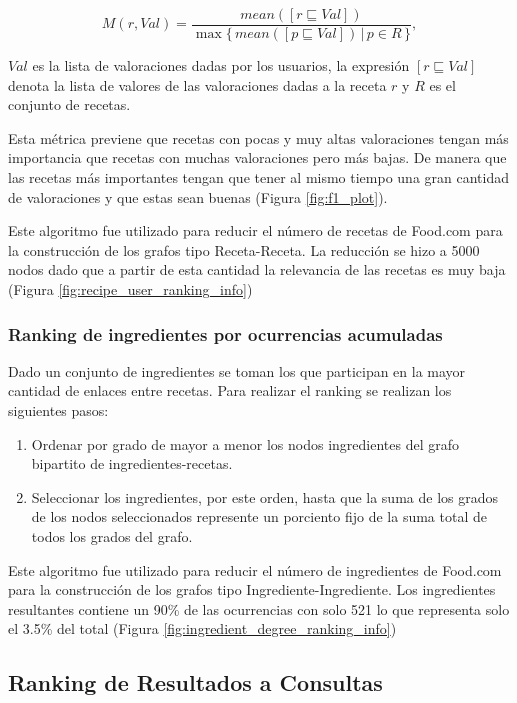 \documentclass[
	a4paper, %
	10pt, %
	unnumberedsections, %
	twoside, %
]{LTJournalArticle}
\begin{document}
\begin{equation*}
	M(r, Val) = \frac{mean([r \sqsubseteq Val])}{\max \{\,mean([p \sqsubseteq Val]) \, \vert \, p \in R\,\}},
\end{equation*}

$Val$ es la lista de valoraciones dadas por los usuarios, la expresión $[r \sqsubseteq Val]$ denota la lista de valores de 
las valoraciones dadas a la receta $r$ y $R$ es el conjunto de recetas.

Esta métrica previene que recetas con pocas y muy altas valoraciones tengan más importancia que recetas con muchas
valoraciones pero más bajas. De manera que las recetas más importantes tengan que tener al mismo tiempo una gran 
cantidad de valoraciones y que estas sean buenas (Figura \ref{fig:f1_plot}).

Este algoritmo fue utilizado para reducir el número de recetas de Food.com para la construcción de los grafos 
tipo Receta-Receta. La reducción se hizo a 5000 nodos dado que a partir de esta cantidad la relevancia de las
recetas es muy baja (Figura \ref{fig:recipe_user_ranking_info})

\subsubsection{Ranking de ingredientes por ocurrencias acumuladas}

Dado un conjunto de ingredientes se toman los que participan en la mayor cantidad de enlaces entre recetas.
Para realizar el ranking se realizan los siguientes pasos:

\begin{enumerate}
	\item Ordenar por grado de mayor a menor los nodos ingredientes del grafo bipartito de ingredientes-recetas.
	\item Seleccionar los ingredientes, por este orden, hasta que la suma de los grados de los nodos seleccionados 
	represente un porciento fijo de la suma total de todos los grados del grafo.
\end{enumerate}

Este algoritmo fue utilizado para reducir el número de ingredientes de Food.com para la construcción de los grafos 
tipo Ingrediente-Ingrediente. Los ingredientes resultantes contiene un 90\% de las ocurrencias
con solo 521 lo que representa solo el 3.5\% del total (Figura \ref{fig:ingredient_degree_ranking_info})

\subsection{Ranking de Resultados a Consultas}
\label{subsec:rank_query}
\end{document}
